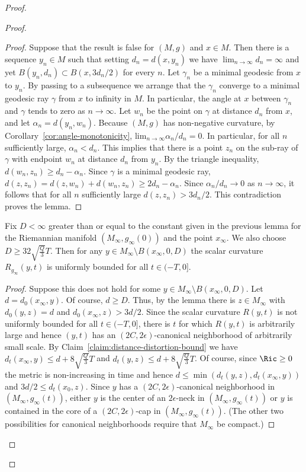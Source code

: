 \begin{proof}
\begin{proof}
\begin{proof}
Suppose that the result is false for $(M,g)$ and $x\in M$. Then
there is a sequence $y_n\in M$ such that setting $d_n=d(x,y_n)$ we
have $\lim_{n\rightarrow\infty}d_n=\infty$ and yet
$B(y_n,d_n)\subset B(x,3d_n/2)$ for every $n$. Let $\gamma_n$ be a
minimal geodesic from $x$ to $y_n$. By passing to a subsequence we
arrange that the $\gamma_n$ converge to a minimal geodesic ray
$\gamma$ from $x$ to infinity in $M$. In particular, the angle at
$x$ between $\gamma_n$ and $\gamma$ tends to zero as
$n\rightarrow\infty$. Let $w_n$ be the point on $\gamma$ at distance
$d_n$ from $x$, and let $\alpha_n=d(y_n,w_n)$. Because $(M,g)$ has
non-negative curvature, by Corollary~\ref{cor:angle-monotonicity}, $\mathrm{lim}_{n\rightarrow\infty}\alpha_n/d_n=0$. In particular, for all $n$
sufficiently large, $\alpha_n<d_n$. This implies that there is a
point $z_n$ on the sub-ray of $\gamma$ with endpoint $w_n$ at
distance $d_n$ from $y_n$. By the triangle inequality,
$d(w_n,z_n)\ge d_n-\alpha_n$. Since $\gamma$ is a minimal geodesic
ray,  $d(z,z_n)=d(z,w_n)+d(w_n,z_n)\ge 2d_n-\alpha_n$. Since
$\alpha_n/d_n\rightarrow 0$ as $n\rightarrow \infty$, it follows
that for all $n$ sufficiently large $d(z,z_n)>3d_n/2$. This
contradiction proves the lemma.
\end{proof}


\begin{claim}
\label{claim:curvature-bound-outside-large-ball}
\label{outerbd}
Fix $D<\infty$ greater than or equal to the constant given in the
previous lemma
 for the Riemannian manifold
$(M_\infty,g_\infty(0))$ and the point $x_\infty$. We also choose
$D\ge 32\sqrt{\frac{Q}{3}}T$. Then for any $y\in M_\infty\setminus
B(x_\infty,0,D)$ the scalar curvature $R_{g_\infty}(y,t)$ is
uniformly bounded for all $t\in (-T,0]$.
\end{claim}

\begin{proof}
Suppose this does not hold for some $y\in M_\infty\setminus
B(x_\infty,0,D)$. Let $d=d_0(x_\infty,y)$. Of course, $d\ge D$.
Thus, by the lemma there is $z\in M_\infty$ with $d_0(y,z)=d$ and
$d_0(x_\infty,z)>3d/2$. Since the scalar curvature $R(y,t)$ is not
uniformly bounded for all $t\in (-T,0]$, there is $t$ for which
$R(y,t)$ is arbitrarily large and hence $(y,t)$ has an
$(2C,2\epsilon)$-canonical neighborhood of arbitrarily small scale.
By Claim~\ref{claim:distance-distortion-bound}  we have $d_{t}(x_\infty,y)\le
d+8\sqrt{\frac{Q}{3}}T$ and $d_{t}(y,z)\le d+8\sqrt{\frac{Q}{3}}T$.
Of course, since $\Ric\ge 0$ the metric is non-increasing in
time and hence $d\le \min(d_{t}(y,z),d_{t}(x_\infty,y))$ and
$3d/2\le d_{t}(x_0,z)$. Since $y$ has a $(2C,2\epsilon)$-canonical
neighborhood in $(M_\infty,g_\infty(t))$, either $y$ is the center
of an $2\epsilon$-neck in $(M_\infty,g_\infty(t))$ or $y$ is
contained in the core of a $(2C,2\epsilon)$-cap in
$(M_\infty,g_\infty(t))$. (The other two possibilities for canonical
neighborhoods require that $M_\infty$ be compact.)


\end{proof}
\end{proof}
\end{proof}
